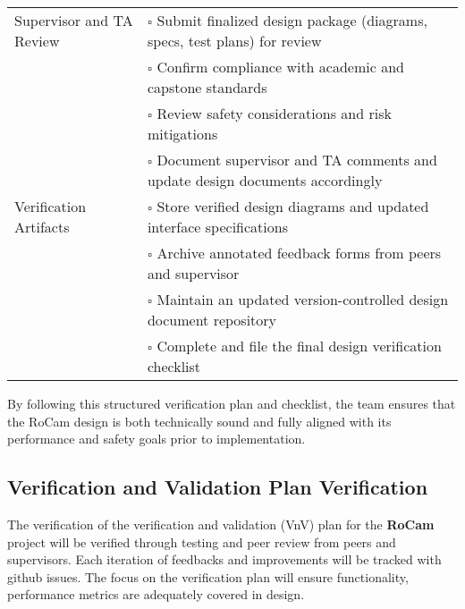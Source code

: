 \documentclass[12pt, titlepage]{article}
\begin{document}
\begin{table}[H]
\begin{tabular}{|p{4.4cm}|p{10.1cm}|}
    Supervisor and TA Review  & $\square$ \; Submit finalized design package
    (diagrams, specs, test plans) for review                                                                             \\[-2pt]
                              & $\square$ \; Confirm compliance with academic and capstone standards                     \\[-2pt]
                              & $\square$ \; Review safety considerations and risk mitigations                           \\[-2pt]
                              & $\square$ \; Document supervisor and TA comments and update design documents accordingly \\ \hline

    Verification Artifacts    & $\square$ \; Store verified design diagrams and
    updated interface specifications                                                                                     \\[-2pt]
                              & $\square$ \; Archive annotated feedback forms from peers and supervisor                  \\[-2pt]
                              & $\square$ \; Maintain an updated version-controlled design document repository           \\[-2pt]
                              & $\square$ \; Complete and file the final design verification checklist                   \\ \hline
  \end{tabular}
\end{table}

\noindent
By following this structured verification plan and checklist, the team
ensures that the RoCam design is both technically sound and fully aligned
with its performance and safety goals prior to implementation.




\subsection{Verification and Validation Plan Verification}

The verification of the verification and validation (VnV) plan for the
\textbf{RoCam} project will be verified through testing and peer review from
peers and supervisors. Each iteration of feedbacks and improvements will be
tracked with github issues. The focus on the verification plan will ensure
functionality, performance metrics are adequately covered in design.
\end{document}
